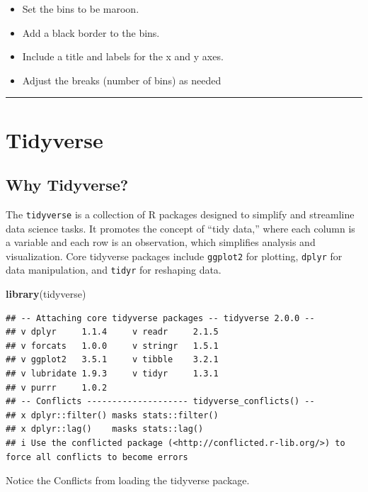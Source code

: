 \documentclass[
]{book}
\newenvironment{Shaded}{\begin{snugshade}}{\end{snugshade}}
\newcommand{\FunctionTok}[1]{\textcolor[rgb]{0.13,0.29,0.53}{\textbf{#1}}}
\newcommand{\NormalTok}[1]{#1}
\providecommand{\tightlist}{%
  \setlength{\itemsep}{0pt}\setlength{\parskip}{0pt}}
\begin{document}
\begin{itemize}
\tightlist
\item
  Set the bins to be maroon.
\item
  Add a black border to the bins.
\item
  Include a title and labels for the x and y axes.
\item
  Adjust the breaks (number of bins) as needed
\end{itemize}

\begin{center}\rule{0.5\linewidth}{0.5pt}\end{center}

\chapter{Tidyverse}\label{tidyverse}

\section{Why Tidyverse?}\label{why-tidyverse}

The \texttt{tidyverse} is a collection of R packages designed to simplify and streamline data science tasks. It promotes the concept of ``tidy data,'' where each column is a variable and each row is an observation, which simplifies analysis and visualization. Core tidyverse packages include \texttt{ggplot2} for plotting, \texttt{dplyr} for data manipulation, and \texttt{tidyr} for reshaping data.

\begin{Shaded}
\begin{Highlighting}[]
\FunctionTok{library}\NormalTok{(tidyverse)}
\end{Highlighting}
\end{Shaded}

\begin{verbatim}
## -- Attaching core tidyverse packages -- tidyverse 2.0.0 --
## v dplyr     1.1.4     v readr     2.1.5
## v forcats   1.0.0     v stringr   1.5.1
## v ggplot2   3.5.1     v tibble    3.2.1
## v lubridate 1.9.3     v tidyr     1.3.1
## v purrr     1.0.2     
## -- Conflicts -------------------- tidyverse_conflicts() --
## x dplyr::filter() masks stats::filter()
## x dplyr::lag()    masks stats::lag()
## i Use the conflicted package (<http://conflicted.r-lib.org/>) to force all conflicts to become errors
\end{verbatim}

Notice the Conflicts from loading the tidyverse package.
\end{document}
